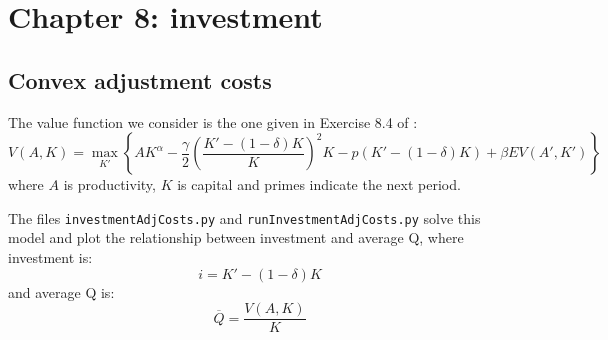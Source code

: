 \section{Chapter 8: investment}

\subsection{Convex adjustment costs}

The value function we consider is the one given in Exercise 8.4 of \citet{adda2003dynamic}:
%
\begin{equation}
	V(A, K) = \max_{K'} \left\{ AK^{\alpha} - \frac{\gamma}{2}\left(\frac{K' - (1 - \delta)K}{K}\right)^2 K - p(K' - (1 - \delta)K) + \beta EV(A', K') \right\}
\end{equation}
%
where \(A\) is productivity, \(K\) is capital and primes indicate the next period.

The files \texttt{investmentAdjCosts.py} and \texttt{runInvestmentAdjCosts.py} solve this model and plot the relationship between investment and average Q, where investment is:
%
\begin{equation}
	i = K' - (1 - \delta)K
\end{equation}
%
and average Q is:
%
\begin{equation}
	\overline{Q} = \frac{V(A, K)}{K}
\end{equation}
%
